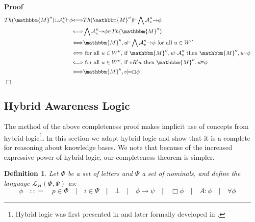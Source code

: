 \documentclass{article}
\newenvironment{proof}{\noindent\textbf{Proof\ }}{\hspace*{\fill}$\Box$\medskip}
\newtheorem{definition}{Definition}
\begin{document}
\begin{proof}
  \begin{align*}
    Th({\mathbbm{M}}''){\cup}\mathcal{A}''_v{\vdash}{\phi} &
    {\Longleftrightarrow}Th({\mathbbm{M}}''){\vdash}\bigwedge\mathcal{A}''_v{\rightarrow}{\phi}\\
    &
    {\Longleftrightarrow}\bigwedge\mathcal{A}''_v{\rightarrow}{\phi}{\in}Th({\mathbbm{M}}'')\\
    &
    {\Longleftrightarrow}{\mathbbm{M}}'',u{\vDash}\bigwedge\mathcal{A}''_v{\rightarrow}{\phi}\text{
    for all $u \in W''$}\\
    & {\Longleftrightarrow}\text{ for all $u \in W''$, if
    }{\mathbbm{M}}'',u{\vDash}\mathcal{A}''_v\text{ then
    }{\mathbbm{M}}'',u{\vDash}{\phi}\\
    & {\Longleftrightarrow}\text{ for all $u \in W''$, if }v R 'u \text{ then
    }{\mathbbm{M}}'',u{\vDash}{\phi}\\
    & {\Longleftrightarrow}{\mathbbm{M}}'',v{\models}\Box{\phi}
  \end{align*}
\end{proof}

\subsection{Hybrid Awareness Logic}

The method of the above completeness proof makes implicit use of concepts from
hybrid logic{\footnote{Hybrid logic was first presented in
{\cite{prior_revised_1969}} and later formally developed in
{\cite{bull_approach_1970}}.}}.  In this section we adapt hybrid logic and
show that it is a complete for reasoning about knowledge bases.  We note that
because of the increased expressive power of hybrid logic, our completeness
theorem is simpler.

\begin{definition}
  Let $\Phi$ be a set of letters and $\Psi$ a set of nominals, and define the
  language $\mathcal{L}_H (\Phi, \Psi)$ as:
  \[ \phi \hspace{1em} : : = \hspace{1em} p \in \Phi \hspace{1em} |
     \hspace{1em} i \in \Psi \hspace{1em} | \hspace{1em} \bot \hspace{1em} |
     \hspace{1em} \phi \rightarrow \psi \hspace{1em} | \hspace{1em} \Box \phi
     \hspace{1em} | \hspace{1em} A : \phi \hspace{1em} | \hspace{1em} \forall
     \phi \]
\end{definition}
\end{document}
